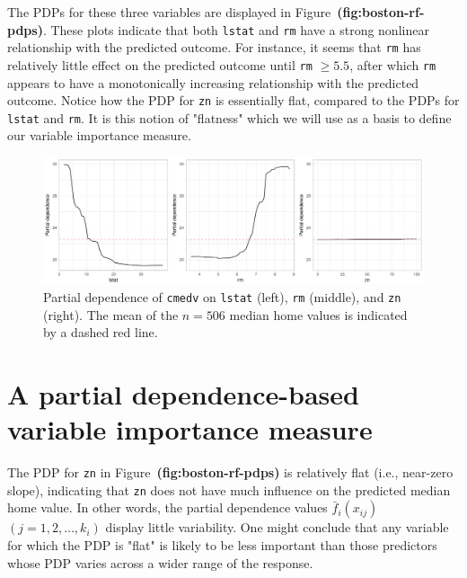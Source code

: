 \documentclass[12pt]{article}
\def\code#1{\texttt{#1}}
\def\ref#1{\textbf{(#1)}}
\begin{document}
The PDPs for these three variables are displayed in Figure~\ref{fig:boston-rf-pdps}. These plots indicate that both \code{lstat} and \code{rm} have a strong nonlinear relationship with the predicted outcome. For instance, it seems that \code{rm} has relatively little effect on the predicted outcome until \code{rm} $\ge 5.5$, after which \code{rm} appears to have a monotonically increasing relationship with the predicted outcome. Notice how the PDP for \code{zn} is essentially flat, compared to the PDPs for \code{lstat} and \code{rm}. It is this notion of "flatness" which we will use as a basis to define our variable importance measure.
\begin{figure}[!htb]
  \centering
  \includegraphics[width=1.0\textwidth]{boston-rf-pdps}
  \caption{Partial dependence of \code{cmedv} on \code{lstat} (left), \code{rm} (middle), and \code{zn} (right). The mean of the $n = 506$ median home values is indicated by a dashed red line. \label{fig:boston-rf-pdps}}
\end{figure}


\section{A partial dependence-based variable importance measure}
\label{sec:new}

The PDP for \code{zn} in Figure~\ref{fig:boston-rf-pdps} is relatively flat (i.e., near-zero slope), indicating that \code{zn} does not have much influence on the predicted median home value. In other words, the partial dependence values $\bar{f}_i\left(x_{ij}\right)$ $\left(j = 1, 2, \dots, k_i\right)$ display little variability. One might conclude that any variable for which the PDP is "flat" is likely to be less important than those predictors whose PDP varies across a wider range of the response.
\end{document}
